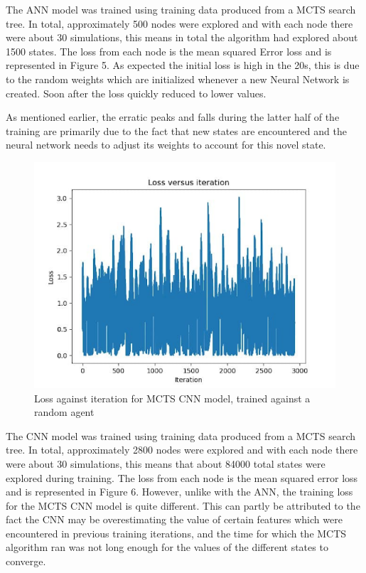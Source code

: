 \documentclass[a4paper,12pt,table]{article}
\begin{document}
The ANN model was trained using training data produced from a MCTS search tree. In total, approximately 500 nodes were explored and with each node there were about 30 simulations, this means in total the algorithm had explored about 1500 states. The loss from each node is the mean squared Error loss and is represented in Figure 5. As expected the initial loss is high in the 20s, this is due to the random weights which are initialized whenever a new Neural Network is created. Soon after the loss quickly reduced to lower values. \par

As mentioned earlier, the erratic peaks and falls during the latter half of the training are primarily due to the fact that new states are encountered and the neural network needs to adjust its weights to account for this novel state.  \par

\begin{figure}[H]
    \begin{center}
        \includegraphics[scale=0.65]{MCTS_CNN.png}
        \caption{Loss against iteration for MCTS CNN model, trained against a random agent}
        \label{fig:}
    \end{center}
\end{figure}
\vspace{-1cm}
The CNN model was trained using training data produced from a MCTS search tree. In total, approximately 2800 nodes were explored and with each node there were about 30 simulations, this means that about 84000 total states were explored during training. The loss from each node is the mean squared error loss and is represented in Figure 6. However, unlike with the ANN, the training loss for the MCTS CNN model is quite different. This can partly be attributed to the fact the CNN may be overestimating the value of certain features which were encountered in previous training iterations, and the time for which the MCTS algorithm ran was not long enough for the values of the different states to converge. \par
\end{document}
